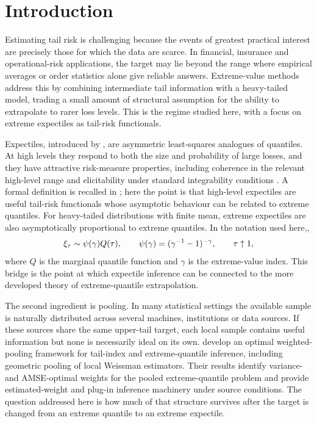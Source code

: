 \chapter{Introduction}
\label{ch:intro}

Estimating tail risk is challenging because the events of greatest practical
interest are precisely those for which the data are scarce. In financial,
insurance and operational-risk applications, the target may lie beyond the
range where empirical averages or order statistics alone give reliable
answers. Extreme-value methods address this by combining intermediate tail
information with a heavy-tailed model, trading a small amount of structural
assumption for the ability to extrapolate to rarer loss levels. This is the
regime studied here, with a focus on extreme expectiles as tail-risk
functionals.

Expectiles, introduced by \textcite{NeweyPowell1987}, are asymmetric
least-squares analogues of quantiles. At high levels they respond to both the
size and probability of large losses, and they have attractive risk-measure
properties, including coherence in the relevant high-level range and
elicitability under standard integrability conditions
\parencite{BelliniKlarMullerRosazzaGianin2014,Ziegel2016,Gneiting2011}.
A formal definition is recalled in ; here the point is
that high-level expectiles are useful tail-risk functionals whose asymptotic
behaviour can be related to extreme quantiles.
For heavy-tailed distributions with finite mean, extreme expectiles are also
asymptotically proportional to extreme quantiles. In the notation used here,,
\[
  \xi_{\tau}
  \sim
  \psi(\gamma)Q(\tau),
  \qquad
  \psi(\gamma)=(\gamma^{-1}-1)^{-\gamma},
  \qquad \tau\uparrow1,
\]
where \(Q\) is the marginal quantile function and \(\gamma\) is the
extreme-value index. This bridge is the point at which expectile inference can
be connected to the more developed theory of extreme-quantile extrapolation.

The second ingredient is pooling. In many statistical settings the available
sample is naturally distributed across several machines, institutions or data
sources. If these sources share the same upper-tail target, each local sample
contains useful information but none is necessarily ideal on its own.
\textcite{DaouiaPadoanStupfler2021} develop an optimal weighted-pooling
framework for tail-index and extreme-quantile inference, including geometric
pooling of local Weissman estimators. Their results identify variance- and
AMSE-optimal weights for the pooled extreme-quantile problem and provide
estimated-weight and plug-in inference machinery under source conditions. The
question addressed here is how much of that structure survives after the target
is changed from an extreme quantile to an extreme expectile.

